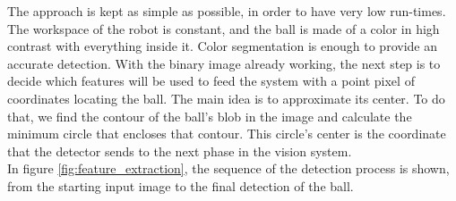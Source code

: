The approach is kept as simple as possible, in order to have very low run-times. The workspace of the robot is constant, and the ball is made of a color in high contrast with everything inside it. Color segmentation is enough to provide an accurate detection. With the binary image already working, the next step is to decide which features will be used to feed the system with a point pixel of coordinates locating the ball. The main idea is to approximate its center. To do that, we find the contour of the ball's blob in the image and calculate the minimum circle that encloses that contour. This circle's center is the coordinate that the detector sends to the next phase in the vision system.\\

In figure \ref{fig:feature_extraction}, the sequence of the detection process is shown, from the starting input image to the final detection of the ball.

